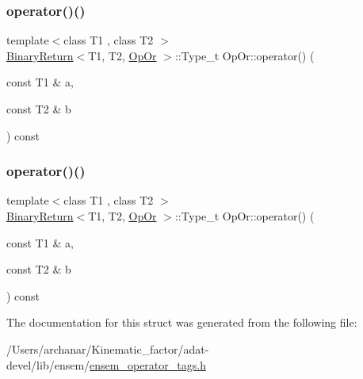 \mbox{\label{structOpOr_a01b11c55d051ff847a53aab673a65582}} 
\subsubsection{\texorpdfstring{operator()()}{operator()()}\hspace{0.1cm}{\footnotesize\ttfamily [2/3]}}
{\footnotesize\ttfamily template$<$class T1 , class T2 $>$ \\
\mbox{\hyperlink{structBinaryReturn}{Binary\+Return}}$<$T1, T2, \mbox{\hyperlink{structOpOr}{Op\+Or}} $>$\+::Type\+\_\+t Op\+Or\+::operator() (\begin{DoxyParamCaption}\item[{const T1 \&}]{a,  }\item[{const T2 \&}]{b }\end{DoxyParamCaption}) const\hspace{0.3cm}{\ttfamily [inline]}}

\mbox{\label{structOpOr_a01b11c55d051ff847a53aab673a65582}} 
\subsubsection{\texorpdfstring{operator()()}{operator()()}\hspace{0.1cm}{\footnotesize\ttfamily [3/3]}}
{\footnotesize\ttfamily template$<$class T1 , class T2 $>$ \\
\mbox{\hyperlink{structBinaryReturn}{Binary\+Return}}$<$T1, T2, \mbox{\hyperlink{structOpOr}{Op\+Or}} $>$\+::Type\+\_\+t Op\+Or\+::operator() (\begin{DoxyParamCaption}\item[{const T1 \&}]{a,  }\item[{const T2 \&}]{b }\end{DoxyParamCaption}) const\hspace{0.3cm}{\ttfamily [inline]}}



The documentation for this struct was generated from the following file\+:\begin{DoxyCompactItemize}
\item 
/\+Users/archanar/\+Kinematic\+\_\+factor/adat-\/devel/lib/ensem/\mbox{\hyperlink{adat-devel_2lib_2ensem_2ensem__operator__tags_8h}{ensem\+\_\+operator\+\_\+tags.\+h}}\end{DoxyCompactItemize}
